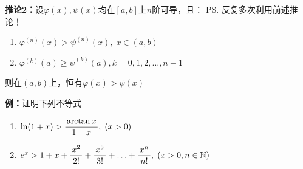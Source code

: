 \begin{center}
\end{center}

{\b {\bf 推论2：}设$\varphi(x),\psi(x) $均在$[a,b]$上$n$阶可导，且：
\ps{反复多次利用前述推论！}
\begin{enumerate}[(1)]
  \setlength{\itemindent}{1cm}
  \item $\varphi^{(n)}(x)>\psi^{(n)}(x),\;x\in(a,b)$
  \item $\varphi^{(k)}(a)\geq\psi^{(k)}(a),k=0,1,2,\ldots,n-1$
\end{enumerate}
则在$(a,b)$上，恒有$\varphi(x)>\psi(x)$}

{\bf 例：}证明下列不等式
\begin{enumerate}[(1)]
  \setlength{\itemindent}{1cm}
  \item $\ln(1+x)>\displaystyle\frac{\,{\arctan x}\,}{\,{1+x}\,},\;(x>0)$
  \item $e^x>1+x+\displaystyle\frac{\,{x^2}\,}{\,{2!}\,}+\displaystyle\frac{\,{x^3}\,}{\,{3!}\,}+\ldots+\displaystyle\frac{\,{x^n}\,}{\,{n!}\,},\;(x>0,n\in\mathbb{N})$
\end{enumerate}

